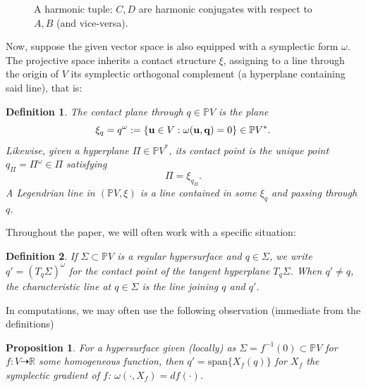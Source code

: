 \documentclass{article}
\newcommand{\R}{\mathbb{R}} %
\newtheorem{defi}{Definition}[section]
\newtheorem{prop}{Proposition}[section]
\begin{document}
\begin{figure}[h]
\centering
{}

    \caption{A harmonic tuple: $C,D$ are harmonic conjugates with respect to $A,B$ (and 
    vice-versa).}
    \label{fig:HarmonicConjugates}
\end{figure}


Now, suppose the given vector space is also equipped with a symplectic form $\omega$. 
The projective space inherits a contact structure $\xi$, assigning to a line through the 
origin of $V$ its symplectic orthogonal complement (a hyperplane containing said line), 
that is:
\begin{defi}\label{def:Polarity}
    The {\em contact plane} through $q\in \mathbb{P}V$ is the plane
\[ \xi_q = q^\omega := \{ {\bf u}\in V : \omega({\bf u},{\bf q}) = 0\} \in \mathbb{P}V^*.\]
Likewise, given a hyperplane $\Pi \in \mathbb{P}V^*$, its \emph{contact point} is the 
unique point 
$q_\Pi = \Pi^\omega  \in \Pi$ satisfying \[\Pi= \xi_{q_\Pi}.\]
A {\em Legendrian line} in $(\mathbb{P}V,\xi)$ is a line contained in some $\xi_q$ and 
passing through $q$.
\end{defi}

Throughout the paper, we will often work with a specific situation: 
\begin{defi}\label{def:CharLine}
    If $\Sigma \subset \mathbb{P}V$ is a regular hypersurface and $q\in \Sigma$, we write 
$q' = (T_q\Sigma)^\omega$ for the contact point of the tangent hyperplane $T_q\Sigma$. When $q'\ne q$,
the \emph{characteristic line} at $q\in\Sigma$ is the line joining $q$ and $q'$. 
\end{defi}

In computations, we may often use the following observation (immediate from the 
definitions)
\begin{prop}\label{prop:SGrad}
    For a hypersurface given (locally) as $\Sigma = f^{-1}(0)\subset \mathbb{P}V$ for 
    $f:V\dashrightarrow \R$ some homogeneous function, then $q' = \text{span}\{ X_f(q)\}$ 
    for $X_f$ the symplectic gradient of $f$: $\omega(\cdot , X_f) = df(\cdot)$.
\end{prop}
\end{document}
